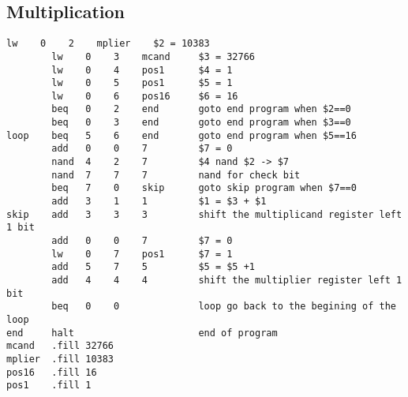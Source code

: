 \documentclass[14pt]{article}
\begin{document}
\subsection{Multiplication}
\begin{lstlisting}[style=assembly]
        lw    0    2    mplier    $2 = 10383
        lw    0    3    mcand     $3 = 32766
        lw    0    4    pos1      $4 = 1
        lw    0    5    pos1      $5 = 1
        lw    0    6    pos16     $6 = 16
        beq   0    2    end       goto end program when $2==0
        beq   0    3    end       goto end program when $3==0
loop    beq   5    6    end       goto end program when $5==16
        add   0    0    7         $7 = 0
        nand  4    2    7         $4 nand $2 -> $7
        nand  7    7    7         nand for check bit
        beq   7    0    skip      goto skip program when $7==0
        add   3    1    1         $1 = $3 + $1
skip    add   3    3    3         shift the multiplicand register left 1 bit
        add   0    0    7         $7 = 0
        lw    0    7    pos1      $7 = 1
        add   5    7    5         $5 = $5 +1
        add   4    4    4         shift the multiplier register left 1 bit
        beq   0    0              loop go back to the begining of the loop
end     halt                      end of program
mcand   .fill 32766
mplier  .fill 10383
pos16   .fill 16
pos1    .fill 1
\end{lstlisting}
\end{document}
